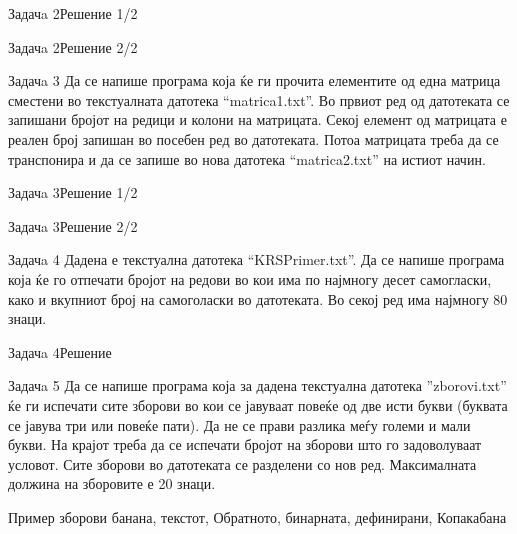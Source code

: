 \begin{frame}[fragile]{Задачa 2}{Решение 1/2} 

\end{frame}



\begin{frame}[fragile]{Задачa 2}{Решение 2/2} 

\end{frame}

\begin{frame}{Задачa 3}
Да се напише програма која ќе ги прочита елементите од една матрица сместени во
текстуалната датотека ``matrica1.txt''. Во првиот ред од датотеката се запишани
бројот на редици и колони на матрицата. Секој елемент од матрицата е реален број
запишан во посебен ред во датотеката. Потоа матрицата треба да се транспонира и
да се запише во нова датотека ``matrica2.txt'' на истиот начин.
\end{frame}

\begin{frame}[fragile]{Задачa 3}{Решение 1/2} 

\end{frame}



\begin{frame}[fragile]{Задачa 3}{Решение 2/2} 

\end{frame}


\begin{frame}{Задачa 4}
Дадена е текстуална датотека ``KRSPrimer.txt''. Да се напише програма која ќе го
отпечати бројот на редови во кои има по најмногу десет самогласки, како и
вкупниот број на самоголаски во датотеката. Во секој ред има најмногу 80 знаци.
\end{frame}

\begin{frame}[fragile]{Задачa 4}{Решение}

\end{frame}

\begin{frame}{Задачa 5}
Да се напише програма која за дадена текстуална датотека ''zborovi.txt'' ќе ги испечати
сите зборови во кои се јавуваат повеќе од две исти букви (буквата се јавува три или
повеќе пати). Да не се прави разлика меѓу големи и мали букви. На крајот треба
да се испечати бројот на зборови што го задоволуваат условот. Сите зборови во
датотеката се разделени со нов ред. Максималната должина на зборовите е 20
знаци.
\begin{exampleblock}{Пример зборови}
банана, текстот, Обратното, бинарната, дефинирани, Копакабана
\end{exampleblock}
\end{frame}

